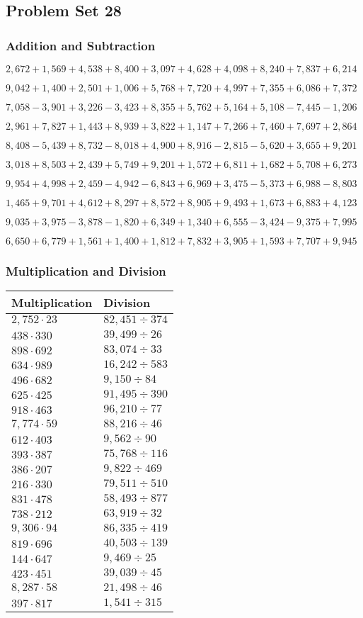\hypertarget{problem-set-28-3}{%
\subsection{Problem Set 28}\label{problem-set-28-3}}

\hypertarget{addition-and-subtraction-190}{%
\subsubsection{Addition and
Subtraction}\label{addition-and-subtraction-190}}

\(2,672+1,569+4,538+8,400+3,097+4,628+4,098+8,240+7,837+ 6,214\)

\(9,042+1,400+2,501+1,006+5,768+7,720+4,997+7,355+6,086+7,372\)

\(7,058-3,901+3,226-3,423+8,355+5,762+5,164+5,108-7,445-1,206\)

\(2,961+7,827+1,443+8,939+3,822+1,147+7,266+7,460+7,697+2,864\)

\(8,408-5,439+8,732-8,018+4,900+8,916-2,815-5,620+3,655+9,201\)

\(3,018+8,503+2,439+5,749+9,201+1,572+6,811+1,682+5,708+6,273\)

\(9,954+4,998+2,459-4,942-6,843+6,969+3,475-5,373+6,988-8,803\)

\(1,465+9,701+4,612+8,297+8,572+8,905+9,493+1,673+6,883+4,123\)

\(9,035+3,975-3,878-1,820+6,349+1,340+6,555-3,424-9,375+7,995\)

\(6,650+6,779+1,561+1,400+1,812+7,832+3,905+1,593+7,707+9,945\)

\hypertarget{multiplication-and-division-189}{%
\subsubsection{Multiplication and
Division}\label{multiplication-and-division-189}}

\begin{longtable}[]{@{}ll@{}}
\toprule
Multiplication & Division\tabularnewline
\midrule
\endhead
\(2,752\cdot23\) & \(82,451÷374\)\tabularnewline
\(438\cdot330\) & \(39,499÷26\)\tabularnewline
\(898\cdot692\) & \(83,074÷33\)\tabularnewline
\(634\cdot989\) & \(16,242÷583\)\tabularnewline
\(496\cdot682\) & \(9,150÷84\)\tabularnewline
\(625\cdot425\) & \(91,495÷390\)\tabularnewline
\(918\cdot463\) & \(96,210÷77\)\tabularnewline
\(7,774\cdot59\) & \(88,216÷46\)\tabularnewline
\(612\cdot403\) & \(9,562÷90\)\tabularnewline
\(393\cdot387\) & \(75,768÷116\)\tabularnewline
\(386\cdot207\) & \(9,822÷469\)\tabularnewline
\(216\cdot330\) & \(79,511÷510\)\tabularnewline
\(831\cdot478\) & \(58,493÷877\)\tabularnewline
\(738\cdot212\) & \(63,919÷32\)\tabularnewline
\(9,306\cdot94\) & \(86,335÷419\)\tabularnewline
\(819\cdot696\) & \(40,503÷139\)\tabularnewline
\(144\cdot647\) & \(9,469÷25\)\tabularnewline
\(423\cdot451\) & \(39,039÷45\)\tabularnewline
\(8,287\cdot58\) & \(21,498÷46\)\tabularnewline
\(397\cdot817\) & \(1,541÷315\)\tabularnewline
\bottomrule
\end{longtable}


